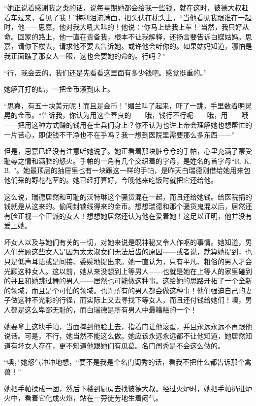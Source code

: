 \par “她正说着感谢我之类的话，说每星期她都会给我一些钱，就在这时，彼德大叔赶着车过来，看见了我！”梅利泪流满面，把头伏在枕头上，“当他看见我跟谁在一起时，他——思嘉，他对我大吼大叫的！他说：‘你马上给我上车！’当然，我只好从命。回家的路上，他一直在责备我，根本不让我解释，还扬言要告诉白蝶姑妈。思嘉，请你下楼去，请求他不要去告诉她。或许他会听你的。如果姑妈知道，哪怕是我正面瞧了那女人一眼，这也会要她的命的。行吗？”
\par “行，我会去的。我们还是先看看这里面有多少钱吧。感觉挺重的。”
\par 她解开打的结，一把金币滚到床上。
\par “思嘉，有五十块美元呢！而且是金币！”媚兰叫了起来，吓了一跳，手里数着明晃晃的金币。“告诉我，你认为用这个善良的——哦，钱行不行呢——哦，用——哦——把用这种方式赚的钱用在士兵们身上？你不认为也许上帝会理解她也想帮忙的一片苦心，即使钱不干净也不在乎吗？我一想到医院里需要那么多东西——”
\par 但是，思嘉已经没有注意听她说了。她正看着那块脏兮兮的手帕，心里充满了蒙受耻辱之情和满腔的怒火。手帕的一角有几个交织着的字母，是姓名的首字母“R. K. B. ”。她最顶层的抽屉里也有一块跟这一样的手帕，是昨天白瑞德刚借给她用来包他们采的野花花茎的。她已经打算好，今晚他来吃饭时就把它还给他。
\par 这么说，瑞德居然和可耻的沃特琳这个骚货混在一起，而且还给她钱。给医院捐的钱就是从这来的。偷闯封锁线得来的金币。想想瑞德和那个骚货鬼混以后，居然还有脸正视一个正派的女人！想想她居然还认为他在爱着她！这足以证明，他并没有爱上她。
\par 坏女人以及与她们有关的一切，对她来说是既神秘又令人作呕的事情。她知道，男人们光顾这些女人是因为太太淑女们无法启齿的原因——或者说，就算她提到，也只是低声耳语或是间接、委婉地提出来。她一直认为，只有平凡、粗俗的男人才会光顾这种女人。这以前，她从来没想到上等男人——也就是她在上等人的家里碰到的并且和她跳过舞的男人——居然也可能做这种事。这给她的思路开拓了一个全新的领域，而且是个可怕的领域。也许所有的男人都会做这种事！他们强迫自己的妻子做这种不光彩的行径，而实际上又去寻找下等女人，而且还付钱给她们！噢，男人都是这么卑鄙无耻的，而白瑞德是所有男人中最糟糕的一个！
\par 她要拿上这块手帕，当面摔到他脸上去，指着门让他滚蛋，并且永远永远不再跟他说话。可是，不行，她当然不能这么做。她应该永远永远都不让他知道，她居然知道有坏女人存在，更不知道他跟她们有瓜葛。名门闺秀是不会这么做的。
\par “噢，”她怒气冲冲地想，“要不是我是个名门闺秀的话，看我不把什么都告诉那个禽兽！”
\par 她把手帕揉成一团，然后下楼到厨房去找彼德大叔。经过火炉时，她把手帕扔进炉火中，看着它化成火焰，站在一旁徒劳地生着闷气。












